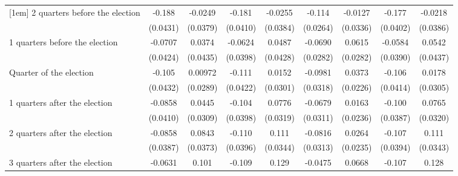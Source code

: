 \begin{table}[htbp]
\begin{tabular}{l*{8}{c}}
[1em]
 2 quarters before the election&      -0.188\sym{***}&     -0.0249         &      -0.181\sym{***}&     -0.0255         &      -0.114\sym{***}&     -0.0127         &      -0.177\sym{***}&     -0.0218         \\
                    &    (0.0431)         &    (0.0379)         &    (0.0410)         &    (0.0384)         &    (0.0264)         &    (0.0336)         &    (0.0402)         &    (0.0386)         \\
[1em]
 1 quarters before the election&     -0.0707         &      0.0374         &     -0.0624         &      0.0487         &     -0.0690\sym{*}  &      0.0615\sym{*}  &     -0.0584         &      0.0542         \\
                    &    (0.0424)         &    (0.0435)         &    (0.0398)         &    (0.0428)         &    (0.0282)         &    (0.0282)         &    (0.0390)         &    (0.0437)         \\
[1em]
Quarter of the election&      -0.105\sym{*}  &     0.00972         &      -0.111\sym{**} &      0.0152         &     -0.0981\sym{**} &      0.0373         &      -0.106\sym{*}  &      0.0178         \\
                    &    (0.0432)         &    (0.0289)         &    (0.0422)         &    (0.0301)         &    (0.0318)         &    (0.0226)         &    (0.0414)         &    (0.0305)         \\
[1em]
 1 quarters after the election&     -0.0858\sym{*}  &      0.0445         &      -0.104\sym{**} &      0.0776\sym{*}  &     -0.0679\sym{*}  &      0.0163         &      -0.100\sym{**} &      0.0765\sym{*}  \\
                    &    (0.0410)         &    (0.0309)         &    (0.0398)         &    (0.0319)         &    (0.0311)         &    (0.0236)         &    (0.0387)         &    (0.0320)         \\
[1em]
 2 quarters after the election&     -0.0858\sym{*}  &      0.0843\sym{*}  &      -0.110\sym{**} &       0.111\sym{**} &     -0.0816\sym{**} &      0.0264         &      -0.107\sym{**} &       0.111\sym{**} \\
                    &    (0.0387)         &    (0.0373)         &    (0.0396)         &    (0.0344)         &    (0.0313)         &    (0.0235)         &    (0.0394)         &    (0.0343)         \\
[1em]
 3 quarters after the election&     -0.0631         &       0.101\sym{***}&      -0.109\sym{**} &       0.129\sym{***}&     -0.0475         &      0.0668\sym{**} &      -0.107\sym{**} &       0.128\sym{***}\\

\end{tabular}
\end{table}
